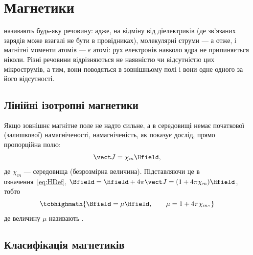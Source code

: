 \section{Магнетики}

\begin{Attention}
	 називають будь-яку речовину: адже, на відміну від діелектриків (де зв'язаних зарядів може взагалі не бути в
	провідниках), молекулярні струми --- а отже, і магнітні моменти атомів --- є  атомі: рух електронів навколо ядра
	не припиняється ніколи. Різні речовини відрізняються не наявністю чи відсутністю цих мікрострумів, а тим,  вони поводяться в
	зовнішньому полі і  вони одне одного за його відсутності.
\end{Attention}

\subsection*{Лінійні ізотропні магнетики}

Якщо зовнішнє магнітне поле не надто сильне, а в середовищі немає початкової (залишкової) намагніченості, намагніченість, як показує дослід, прямо
пропорційна полю:
\begin{equation}\label{eq:LinearMedium}
	\vect J = \chi_m\Hfield,
\end{equation}
де $\chi_m$ ---  середовища (безрозмірна величина). Підставляючи це в означення~\eqref{eq:HDef}, $\Bfield = \Hfield
+ 4\pi\vect J = (1+4\pi\chi_m)\Hfield$, тобто
\begin{equation}\label{eq:BMuH}
	\tcbhighmath{
		\Bfield = \mu\Hfield, \qquad \mu = 1+4\pi\chi_m,
	}
\end{equation}
де величину $\mu$ називають .

\subsection*{Класифікація магнетиків}

